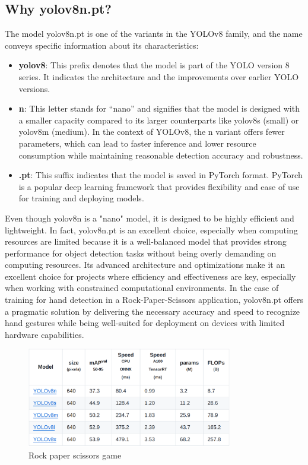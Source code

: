 \documentclass[../main]{subfiles}
\begin{document}
\subsection{Why yolov8n.pt?}
The model yolov8n.pt is one of the variants in the YOLOv8 family, and the name conveys specific information about its characteristics:
\begin{itemize}
\item[\textbullet] \textbf{yolov8}: This prefix denotes that the model is part of the YOLO version 8 series. It indicates the architecture and the improvements over earlier YOLO versions.
\item[\textbullet] \textbf{n}: This letter stands for “nano” and signifies that the model is designed with a smaller capacity compared to its larger counterparts like yolov8s (small) or yolov8m (medium). In the context of YOLOv8, the n variant offers fewer parameters, which can lead to faster inference and lower resource consumption while maintaining reasonable detection accuracy and robustness.
\item[\textbullet] \textbf{.pt}: This suffix indicates that the model is saved in PyTorch format. PyTorch is a popular deep learning framework that provides flexibility and ease of use for training and deploying models.
\end{itemize}
Even though yolov8n is a "nano" model, it is designed to be highly efficient and lightweight. In fact, yolov8n.pt is an excellent choice, especially when computing resources are limited because it is a well-balanced model that provides strong performance for object detection tasks without being overly demanding on computing resources. Its advanced architecture and optimizations make it an excellent choice for projects where efficiency and effectiveness are key, especially when working with constrained computational environments. In the case of training for hand detection in a Rock-Paper-Scissors application, yolov8n.pt offers a pragmatic solution by delivering the necessary accuracy and speed to recognize hand gestures while being well-suited for deployment on devices with limited hardware capabilities.

\begin{figure}[H]
   \centering
   \includegraphics[width=0.8\textwidth]{./figures/imagen1}
   \caption{Rock paper scissors game}
 \label{fig:red}
\end{figure}
\end{document}
